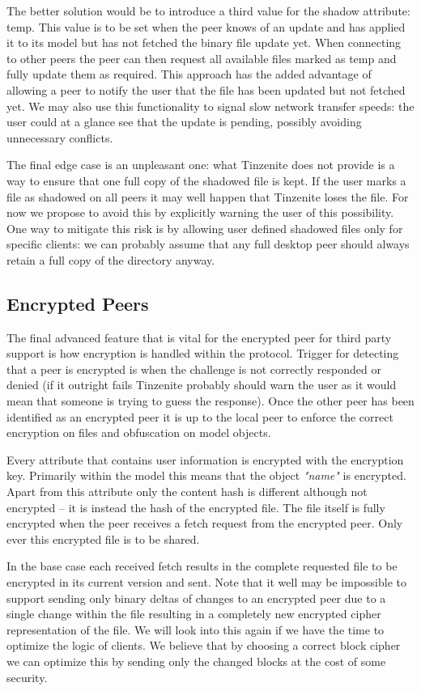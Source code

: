 The better solution would be to introduce a third value for the shadow attribute: temp.
This value is to be set when the peer knows of an update and has applied it to its model but has not fetched the binary file update yet.
When connecting to other peers the peer can then request all available files marked as temp and fully update them as required.
This approach has the added advantage of allowing a peer to notify the user that the file has been updated but not fetched yet.
We may also use this functionality to signal slow network transfer speeds: the user could at a glance see that the update is pending, possibly avoiding unnecessary conflicts.

The final edge case is an unpleasant one: what Tinzenite does not provide is a way to ensure that one full copy of the shadowed file is kept.
If the user marks a file as shadowed on all peers it may well happen that Tinzenite loses the file.
For now we propose to avoid this by explicitly warning the user of this possibility.
One way to mitigate this risk is by allowing user defined shadowed files only for specific clients: we can probably assume that any full desktop peer should always retain a full copy of the directory anyway.


\subsection{Encrypted Peers}
\label{sub:Encrypted Peers}

The final advanced feature that is vital for the encrypted peer for third party support is how encryption is handled within the protocol.
Trigger for detecting that a peer is encrypted is when the challenge is not correctly responded or denied (if it outright fails Tinzenite probably should warn the user as it would mean that someone is trying to guess the response).
Once the other peer has been identified as an encrypted peer it is up to the local peer to enforce the correct encryption on files and obfuscation on model objects.

Every attribute that contains user information is encrypted with the encryption key.
Primarily within the model this means that the object \textit{"name"} is encrypted.
Apart from this attribute only the content hash is different although not encrypted – it is instead the hash of the encrypted file.
The file itself is fully encrypted when the peer receives a fetch request from the encrypted peer.
Only ever this encrypted file is to be shared.

In the base case each received fetch results in the complete requested file to be encrypted in its current version and sent.
Note that it well may be impossible to support sending only binary deltas of changes to an encrypted peer due to a single change within the file resulting in a completely new encrypted cipher representation of the file.
We will look into this again if we have the time to optimize the logic of clients.
We believe that by choosing a correct block cipher we can optimize this by sending only the changed blocks at the cost of some security.
